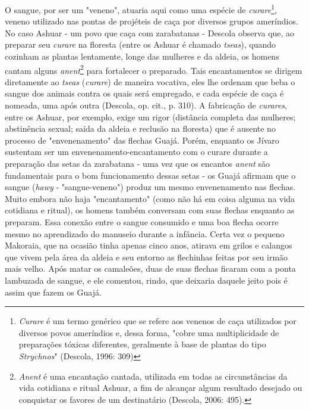 O sangue, por ser um "veneno", atuaria aqui como uma espécie de
\emph{curare}\footnote{\emph{Curare} é um termo genérico que se refere
  aos venenos de caça utilizados por diversos povos ameríndios e, dessa
  forma, "cobre uma multiplicidade de preparações tóxicas diferentes,
  geralmente à base de plantas do tipo \emph{Strychnos}" (Descola, 1996:
  309)}, veneno utilizado nas pontas de projéteis de caça por diversos
grupos ameríndios. No caso Ashuar - um povo que caça com zarabatanas -
Descola observa que, ao preparar seu \emph{curare} na floresta (entre os
Ashuar é chamado \emph{tseas}), quando cozinham as plantas lentamente,
longe das mulheres e da aldeia, os homens cantam alguns
\emph{anent}\footnote{\emph{Anent} é uma encantação cantada, utilizada
  em todas as circunstâncias da vida cotidiana e ritual Ashuar, a fim de
  alcançar algum resultado desejado ou conquistar os favores de um
  destinatário (Descola, 2006: 495).} para fortalecer o preparado. Tais
encantamentos se dirigem diretamente ao \emph{tseas} (\emph{curare}) de
maneira vocativa, eles lhe ordenam que beba o sangue dos animais contra
os quais será empregado, e cada espécie de caça é nomeada, uma após
outra (Descola, op. cit., p. 310). A fabricação de \emph{curares}, entre
os Ashuar, por exemplo, exige um rigor (distância completa das mulheres;
abstinência sexual; saída da aldeia e reclusão na floresta) que é
ausente no processo de "envenenamento" das flechas Guajá. Porém,
enquanto os Jívaro sustentam ser um envenenamento-encantamento com o
curare durante a preparação das setas da zarabatana - uma vez que os
encantos \emph{anent} são fundamentais para o bom funcionamento dessas
setas - os Guajá afirmam que o sangue (\emph{hawy} - "sangue-veneno")
produz um mesmo envenenamento nas flechas. Muito embora não haja
"encantamento" (como não há em coisa alguma na vida cotidiana e ritual),
os homens também conversam com suas flechas enquanto as preparam. Essa
conexão entre o sangue consumido e uma boa flecha ocorre mesmo no
aprendizado do manuseio durante a infância. Certa vez o pequeno
Makoraia, que na ocasião tinha apenas cinco anos, atirava em grilos e
calangos que vivem pela área da aldeia e seu entorno as flechinhas
feitas por seu irmão mais velho. Após matar os camaleões, duas de suas
flechas ficaram com a ponta lambuzada de sangue, e ele comentou, rindo,
que deixaria daquele jeito pois é assim que fazem os Guajá.

